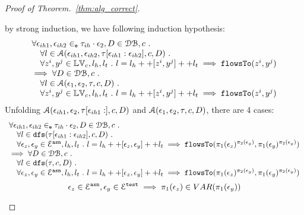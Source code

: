 \begin{proof}[Proof of Theorem.~\ref{thm:alg_correct}]
\begin{case}
\end{case}
%
\begin{case}
[$\trace = \event_1 \tracecat \trace_{ih} \cdot \event_2 \land \trace_{ih} \neq \cdot$]
by strong induction, we have following induction hypothesis:
%
\[
\begin{array}{l}
  \forall \mathtt{\epsilon}_{ih1}, \mathtt{\epsilon}_{ih2} \in_{\mathtt{e}} \mathtt{\tau}_{ih} \cdot \mathtt{\epsilon}_2, D \in \mathcal{DB} , c ~.~
  \\ \quad 
   \forall l \in \mathcal{A}(\mathtt{\epsilon}_{ih1}, \mathtt{\epsilon}_{ih2}, \mathtt{\tau}[\mathtt{\epsilon}_{ih1}:\mathtt{\epsilon}_{ih2}], c, D) ~.~
   \\ \quad 
   \forall z^i, y^j \in \mathbb{LV}_c, l_h, l_t ~.~ 
   l = l_h ++ [z^i, y^j] ++ l_t 
   \implies \mathtt{flowsTo}(z^i, y^j)
   \\
   \implies
   \forall D \in \mathcal{DB} , c ~.~
  \\ \quad 
   \forall l \in \mathcal{A}(\mathtt{\epsilon}_1, \mathtt{\epsilon}_2, \mathtt{\tau}, c, D) ~.~
   \\ \quad 
   \forall z^i, y^j \in \mathbb{LV}_c, l_h, l_t ~.~ 
   l = l_h ++ [z^i, y^j] ++ l_t 
   \implies \mathtt{flowsTo}(z^i, y^j)  
\end{array}
\]
%
Unfolding $\mathcal{A}(\mathtt{\epsilon}_{ih1}, \mathtt{\epsilon}_{2}, \mathtt{\tau}[\mathtt{\epsilon}_{ih1}:], c, D)$ and $\mathcal{A}(\mathtt{\epsilon}_1, \mathtt{\epsilon}_2, \mathtt{\tau}, c, D)$, there are 4 cases:
\begin{equation}
\begin{array}{l}
  \forall \mathtt{\epsilon}_{ih1}, \mathtt{\epsilon}_{ih2} \in_{\mathtt{e}} \mathtt{\tau}_{ih} \cdot \mathtt{\epsilon}_2, D \in \mathcal{DB} , c ~.~
  \\ \quad 
   \forall l \in \mathtt{dfs}(\mathtt{\tau}[\mathtt{\epsilon}_{ih1}:\mathtt{\epsilon}_{ih2}], c, D) ~.~
   \\ \quad 
   \forall \mathtt{\epsilon}_z, \mathtt{\epsilon}_y \in \mathcal{E}^{\mathtt{{asn}}}, l_h, l_t ~.~ 
   l = l_h ++ [\mathtt{\epsilon}_z, \mathtt{\epsilon}_y] ++ l_t 
   \implies \mathtt{flowsTo}(\pi_1(\mathtt{\epsilon}_z)^{\pi_2(\mathtt{\epsilon}_y)}, \pi_1(\mathtt{\epsilon}_y)^{\pi_2(\mathtt{\epsilon}_y)})
   \\
   \implies
   \forall D \in \mathcal{DB} , c ~.~
  \\ \quad 
   \forall l \in \mathtt{dfs}(\mathtt{\tau}, c, D) ~.~
   \\ \quad 
   \forall \mathtt{\epsilon}_z, \mathtt{\epsilon}_y \in \mathcal{E}^{\mathtt{{asn}}}, l_h, l_t ~.~ 
   l = l_h ++ [\mathtt{\epsilon}_z, \mathtt{\epsilon}_y] ++ l_t 
   \implies \mathtt{flowsTo}(\pi_1(\mathtt{\epsilon}_z)^{\pi_2(\mathtt{\epsilon}_y)}, \pi_1(\mathtt{\epsilon}_y)^{\pi_2(\mathtt{\epsilon}_y)})
\end{array}
\end{equation}
%
\begin{equation}
  \event_z \in \eventset^{\asn}, \event_y \in \eventset^{\test}
  \implies \pi_1(\event_z) \in VAR(\pi_1(\event_y))

\end{equation}
\end{case}
\end{proof}
